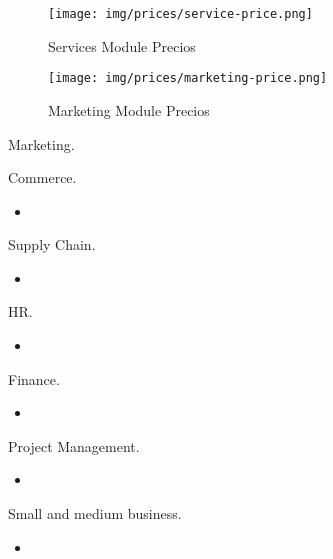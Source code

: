 \begin{figure}[h]
	\centering
	\texttt{[image: img/prices/service-price.png]}
	\label{fig:Service Module precios}
	\caption{Services Module Precios}
\end{figure}

\begin{figure}[h]
    \centering
    \texttt{[image: img/prices/marketing-price.png]}
    \label{fig:Marketing Module precios}
    \caption{Marketing Module Precios}
\end{figure}

\item Marketing.
                
            \item Commerce.
                \begin{itemize}
                    \item   
                \end{itemize}
            \item Supply Chain.
                \begin{itemize}
                    \item   
                \end{itemize}
            \item HR.
                \begin{itemize}
                    \item  
                \end{itemize}
            \item Finance.
                \begin{itemize}
                    \item   
                \end{itemize}
            \item Project Management.
                \begin{itemize}
                    \item   
                \end{itemize}
            \item Small and medium business.
                \begin{itemize}
                    \item   
                \end{itemize}